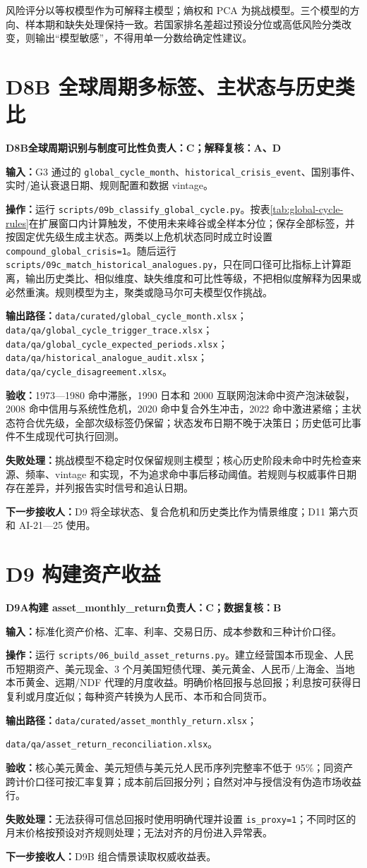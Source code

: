 \documentclass[UTF8,fontset=windows,12pt,openany]{ctexbook}
\newcommand{\Field}[1]{{\small\nolinkurl{#1}}}
\newcommand{\File}[1]{{\small\nolinkurl{#1}}}
\newcommand{\StepTitle}[3]{%
  \noindent\colorbox{DeepNavy}{\parbox{0.965\textwidth}{\color{white}\Large\bfseries #1\quad #2\hfill\normalsize #3}}\par\medskip
}
\newcommand{\CardRow}[2]{\noindent\textbf{#1：}#2\par}
\begin{document}
风险评分以等权模型作为可解释主模型；熵权和 PCA 为挑战模型。三个模型的方向、样本期和缺失处理保持一致。若国家排名差超过预设分位或高低风险分类改变，则输出“模型敏感”，不得用单一分数给确定性建议。

\newpage
\section{D8B 全球周期多标签、主状态与历史类比}
\StepTitle{D8B}{全球周期识别与制度可比性}{负责人：C；解释复核：A、D}
\CardRow{输入}{G3 通过的 \Field{global_cycle_month}、\Field{historical_crisis_event}、国别事件、实时/追认衰退日期、规则配置和数据 vintage。}
\CardRow{操作}{运行 \File{scripts/09b_classify_global_cycle.py}。按表\ref{tab:global-cycle-rules}在扩展窗口内计算触发，不使用未来峰谷或全样本分位；保存全部标签，并按固定优先级生成主状态。两类以上危机状态同时成立时设置 \Field{compound_global_crisis=1}。随后运行 \File{scripts/09c_match_historical_analogues.py}，只在同口径可比指标上计算距离，输出历史类比、相似维度、缺失维度和可比性等级，不把相似度解释为因果或必然重演。规则模型为主，聚类或隐马尔可夫模型仅作挑战。}
\CardRow{输出路径}{\File{data/curated/global_cycle_month.xlsx}；\File{data/qa/global_cycle_trigger_trace.xlsx}；\File{data/qa/global_cycle_expected_periods.xlsx}；\File{data/qa/historical_analogue_audit.xlsx}；\File{data/qa/cycle_disagreement.xlsx}。}
\CardRow{验收}{1973—1980 命中滞胀，1990 日本和 2000 互联网泡沫命中资产泡沫破裂，2008 命中信用与系统性危机，2020 命中复合外生冲击，2022 命中激进紧缩；主状态符合优先级，全部次级标签仍保留；状态发布日期不晚于决策日；历史低可比事件不生成现代可执行回测。}
\CardRow{失败处理}{挑战模型不稳定时仅保留规则主模型；核心历史阶段未命中时先检查来源、频率、vintage 和实现，不为追求命中事后移动阈值。若规则与权威事件日期存在差异，并列报告实时信号和追认日期。}
\CardRow{下一步接收人}{D9 将全球状态、复合危机和历史类比作为情景维度；D11 第六页和 AI-21—25 使用。}

\newpage
\section{D9 构建资产收益}
\StepTitle{D9A}{构建 asset\_monthly\_return}{负责人：C；数据复核：B}
\CardRow{输入}{标准化资产价格、汇率、利率、交易日历、成本参数和三种计价口径。}
\CardRow{操作}{运行 \File{scripts/06_build_asset_returns.py}。建立经营国本币现金、人民币短期资产、美元现金、3 个月美国短债代理、美元黄金、人民币/上海金、当地本币黄金、远期/NDF 代理的月度收益。明确价格回报与总回报；利息按可获得日复利或月度近似；每种资产转换为人民币、本币和合同货币。}
\CardRow{输出路径}{\File{data/curated/asset_monthly_return.xlsx}；\par\File{data/qa/asset_return_reconciliation.xlsx}。}
\CardRow{验收}{核心美元黄金、美元短债与美元兑人民币序列完整率不低于 95\%；同资产跨计价口径可按汇率复算；成本前后回报分列；自然对冲与授信没有伪造市场收益行。}
\CardRow{失败处理}{无法获得可信总回报时使用明确代理并设置 \Field{is_proxy=1}；不同时区的月末价格按预设对齐规则处理；无法对齐的月份进入异常表。}
\CardRow{下一步接收人}{D9B 组合情景读取权威收益表。}
\end{document}
